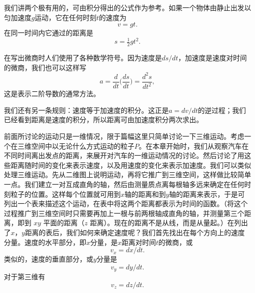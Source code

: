 我们讲两个极有用的，可由积分得出的公式作为参考。如果一个物体由静止出发以匀加速度$g$运动，它在任何时刻$t$的速度为
\begin{equation*}
v=gt.
\end{equation*}
在同一时间内它通过的距离是
\begin{equation*}
s=\tfrac{1}{2}gt^2.
\end{equation*}

在写出微商时人们使用了各种数学符号。因为速度是$ds/dt$，加速度是速度对时间的微商，我们也可以这样写
\begin{equation}
\label{Eq:I:8:10}
a=\frac{d}{dt}\biggl(\frac{ds}{dt}\biggr)=\frac{d^2s}{dt^2},
\end{equation}
这是表示二阶导数的通常方法。

我们还有另一条规则：速度等于加速度的积分。这正是$a=dv/dt$的逆过程；我们已经看到距离是速度的积分，所以距离可由加速度积分两次求出。

前面所讨论的运动只是一维情况，限于篇幅这里只简单讨论一下三维运动。考虑一个在三维空间中以无论什么方式运动的粒子$P$。在本章开始时，我们从观察汽车在不同时间离出发点的距离，来展开对汽车的一维运动情况的讨论。然后讨论了用这些距离随时间的变化来表示速度，以及用速度的变化来表示加速度。我们可以类似处理三维运动。先从二维图上说明运动，再将它推广到三维空间，这样做比较简单一点。我们建立一对互成直角的轴，然后由测量质点离每根轴多远来确定在任何时刻粒子的位置。这样每个位置就可用到$x$轴的距离和到$y$轴的距离来表示，于是可列出一个表来描述这个运动，在表中将这两个距离都表示为时间的函数。（将这个过程推广到三维空间时只需要再加上一根与前两根轴成直角的轴，并测量第三个距离，即到 $xy$ 平面的距离（$z$ 距离）。现在的距离不是从线，而是从量起。）在列出了$x$，$y$距离的表后，我们如何来确定速度呢？我们首先找出在每个方向上的速度分量。速度的水平部分，即$x$分量，是$x$距离对时间$t$的微商，或
\begin{equation}
\label{Eq:I:8:11}
v_x =dx/dt.
\end{equation}
类似的，速度的垂直部分，或$y$分量是
\begin{equation}
\label{Eq:I:8:12}
v_y = dy/dt.
\end{equation}
对于第三维有
\begin{equation}
\label{Eq:I:8:13}
v_z = dz/dt.
\end{equation}

